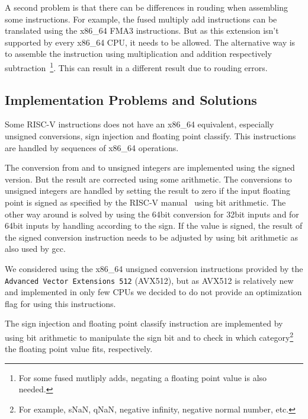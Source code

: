 \documentclass[course=eragp]{aspdoc}
\begin{document}
\par


A second problem is that there can be differences in rouding when assembling some instructions. For
example, the fused multiply add instructions can be translated using the x86\_64 FMA3 instructions.
But as this extension isn't supported by every x86\_64 CPU, it needs to be allowed. The alternative
way is to assemble the instruction using multiplication and addition respectively
subtraction~\footnote{For some fused mutliply adds, negating a floating point value is also
    needed.}. This can result in a different result due to rouding errors.


\subsection{Implementation Problems and Solutions}

Some RISC-V instructions does not have an x86\_64 equivalent, especially unsigned conversions, sign
injection and floating point classify. This instructions are handled by sequences of x86\_64
operations.

\par

The conversion from and to unsigned integers are implemented using the signed version. But the
result are corrected using some arithmetic. The conversions to unsigned integers are handled by
setting the result to zero if the input floating point is signed as specified by the RISC-V
manual~\cite{rvspec} using bit arithmetic. The other way around is solved by using the 64bit
conversion for 32bit inputs and for 64bit inputs by handling according to the sign. If the value is
signed, the result of the signed conversion instruction needs to be adjusted by using bit arithmetic
as also used by gcc.

\par

We considered using the x86\_64 unsigned conversion instructions provided by the \texttt{Advanced
    Vector Extensions 512} (AVX512), but as AVX512 is relatively new and implemented in only few CPUs we
decided to do not provide an optimization flag for using this instructions.

\par

The sign injection and floating point classify instruction are implemented by using bit arithmetic
to manipulate the sign bit and to check in which category\footnote{For example, sNaN, qNaN, negative
    infinity, negative normal number, etc.} the floating point value fits, respectively.
\end{document}
